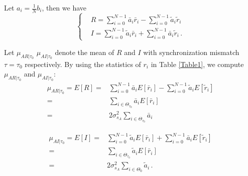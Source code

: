 Let $a_i = \frac{1}{N}b_i$, then we have 
\begin{equation}
  \begin{cases}
	&R = \sum_{i=0}^{N-1}\bar{a}_i\bar{r}_i - \sum_{i=0}^{N-1}\tilde{a}_i\tilde{r}_i\\
	&I = \sum_{i=0}^{N-1}\tilde{a}_i\bar{r}_i +\sum_{i=0}^{N-1}\bar{a}_i\tilde{r}_i\,.
  \end{cases}
  \label{definitionofRI}
\end{equation}

Let $\mu_{AR|\tau_0}$ $\mu_{AI|\tau_0}$ denote the mean of $R$ and $I$ with synchronization mismatch $\tau=\tau_0$ respectively. By using the statistics of $r_i$ in Table \ref{Table1}, we compute  $\mu_{AR|\tau_0}$ and  $\mu_{AI|\tau_0}$:
\begin{equation}
  \begin{split}
	\mu_{AR|\tau_0} =  E[R] = &\sum_{i=0}^{N-1}\bar{a}_iE[\bar{r}_i] - \sum_{i=0}^{N-1}\tilde{a}_iE[\tilde{r}_i]\\
	= &\sum_{i\in\Theta_{\tau_0}}\bar{a}_iE[\bar{r}_i]\\
	= &2\sigma_{s_A}^2\sum_{i\in\Theta_{\tau_0}}\bar{a}_i
  \end{split}
  \label{ER}
\end{equation}

\begin{equation}
  \begin{split}
	\mu_{AI|\tau_0} =  E[I] = &\sum_{i=0}^{N-1}\tilde{a}_iE[\bar{r}_i] + \sum_{i=0}^{N-1}\bar{a}_iE[\tilde{r}_i]\\
	= &\sum_{i\in\Theta_{\tau_0}}\tilde{a}_iE[\bar{r}_i]\\
	= &2\sigma_{s_A}^2\sum_{i\in\Theta_0}\tilde{a}_i\,.
  \end{split}
  \label{EI}
\end{equation}

